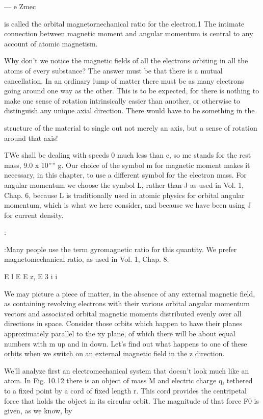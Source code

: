 { ---  e
Zmec

is called the orbital magnetornechanical ratio for the electron.1 The
intimate connection between magnetic moment and angular momentum
is central to any account of atomic magnetism.

Why don't we notice the magnetic fields of all the electrons orbiting
in all the atoms of every substance? The answer must be that
there is a mutual cancellation. In an ordinary lump of matter there
must be as many electrons going around one way as the other. This
is to be expected, for there is nothing to make one sense of rotation
intrinsically easier than another, or otherwise to distinguish any
unique axial direction. There would have to be something in the

structure of the material to single out not merely an axis, but a sense
of rotation around that axis!

TWe shall be dealing with speeds 0 much less than c, so me stands for the rest mass,
9.0 x 10'''' g. Our choice of the symbol m for magnetic moment makes it 
necessary, in this chapter, to use a different symbol for the electron mass. For angular
momentum we choose the symbol L, rather than J as used in Vol. 1, Chap. 6, because
L is traditionally used in atomic physics for orbital angular momentum, which is what
we here consider, and because we have been using J for current density.

:{:Many people use the term gyromagnetic ratio for this quantity. We prefer 
magnetomechanical ratio, as used in Vol. 1, Chap. 8.

E
l
E
E
z,
E
3
i
i

We may picture a piece of matter, in the absence of any external
magnetic field, as containing revolving electrons with their various
orbital angular momentum vectors and associated orbital magnetic
moments distributed evenly over all directions in space. Consider
those orbits which happen to have their planes approximately parallel
to the xy plane, of which there will be about equal numbers with
m up and in down. Let's find out what happens to one of these orbits
when we switch on an external magnetic field in the z direction.

We'll analyze first an electromechanical system that doesn't look
much like an atom. In Fig. 10.12 there is an object of mass M and
electric charge q, tethered to a fixed point by a cord of fixed length r.
This cord provides the centripetal force that holds the object in its
circular orbit. The magnitude of that force F0 is given, as we
know, by

}}
